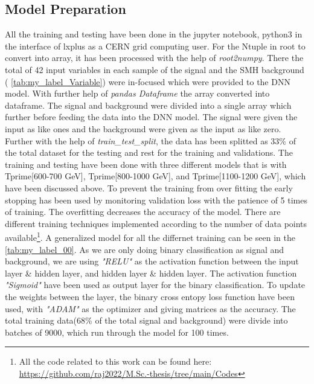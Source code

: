 \subsection{Model Preparation}
All the training and testing have been done in the jupyter notebook\cite{Kluyver2016jupyter}, python3 in the interface of lxplus as a CERN grid computing user. For the Ntuple in root to convert into array, it has been processed with the help of \textit{root2numpy}\cite{ml_4}\cite{noel_dawe_2017_842249}. There the total of 42 input variables in each sample of the signal and the SMH background ( \autoref{tab:my_label_Variable}) were in-focused which were provided to the DNN model. With further help of \textit{pandas Dataframe} \cite{reback2020pandas} the array converted into dataframe. The signal and background were divided into a single array which further before feeding the data into the DNN model. The signal were given the input as like ones and the background were given as the input as like zero. Further with the help of \textit{train\_test\_split}\cite{scikit-learn}, the data has been splitted as 33\% of the total dataset for the testing and rest for the training and validations. The training and testing have been done with three different models that is with Tprime[600-700 GeV], Tprime[800-1000 GeV], and Tprime[1100-1200 GeV], which have been discussed above. To prevent the training from over fitting the early stopping has been used by monitoring validation loss with the patience of 5 times of training. The overfitting decreases the accuracy of the model. There are different training techniques implemented according to the number of data points available\footnote{All the code related to this work can be found here: \url{https://github.com/raj2022/M.Sc.-thesis/tree/main/Codes}}. A generalized model for all the differnet training can be seen in the \autoref{tab:my_label_00}. As we are only doing binary classification as signal and background, we are using \textit{"RELU"} as the activation function between the input layer \& hidden layer, and hidden layer \& hidden layer. The activation function \textit{"Sigmoid"} have been used as output layer for the binary classification. To update the weights between the layer, the binary cross entopy loss function have been used, with \textit{"ADAM"} as the optimizer and giving matrices as the accuracy. The total training data(68\% of the total signal and background) were divide into batches of 9000, which run through the model for 100 times. 

